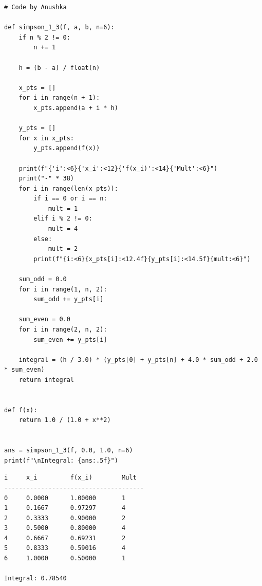 \documentclass[10pt,a4paper]{report}
\begin{document}
\begin{tcolorbox}[colback=codebg,colframe=secondary,title=\textbf{Python Implementation (Step-by-Step Loops \& Pure Functions)},boxrule=1pt,arc=2mm]
\begin{lstlisting}[style=python_detailed]
# Code by Anushka

def simpson_1_3(f, a, b, n=6):
    if n % 2 != 0:
        n += 1

    h = (b - a) / float(n)

    x_pts = []
    for i in range(n + 1):
        x_pts.append(a + i * h)

    y_pts = []
    for x in x_pts:
        y_pts.append(f(x))

    print(f"{'i':<6}{'x_i':<12}{'f(x_i)':<14}{'Mult':<6}")
    print("-" * 38)
    for i in range(len(x_pts)):
        if i == 0 or i == n:
            mult = 1
        elif i % 2 != 0:
            mult = 4
        else:
            mult = 2
        print(f"{i:<6}{x_pts[i]:<12.4f}{y_pts[i]:<14.5f}{mult:<6}")

    sum_odd = 0.0
    for i in range(1, n, 2):
        sum_odd += y_pts[i]

    sum_even = 0.0
    for i in range(2, n, 2):
        sum_even += y_pts[i]

    integral = (h / 3.0) * (y_pts[0] + y_pts[n] + 4.0 * sum_odd + 2.0 * sum_even)
    return integral


def f(x):
    return 1.0 / (1.0 + x**2)


ans = simpson_1_3(f, 0.0, 1.0, n=6)
print(f"\nIntegral: {ans:.5f}")

\end{lstlisting}
\end{tcolorbox}

\begin{tcolorbox}[colback=termbg,colframe=primary,title=\textbf{Program Execution Output \& Convergence Table},boxrule=1pt,arc=2mm]
\begin{lstlisting}[style=terminal_output]
i     x_i         f(x_i)        Mult  
--------------------------------------
0     0.0000      1.00000       1     
1     0.1667      0.97297       4     
2     0.3333      0.90000       2     
3     0.5000      0.80000       4     
4     0.6667      0.69231       2     
5     0.8333      0.59016       4     
6     1.0000      0.50000       1     

Integral: 0.78540
\end{lstlisting}
\end{tcolorbox}
\end{document}
